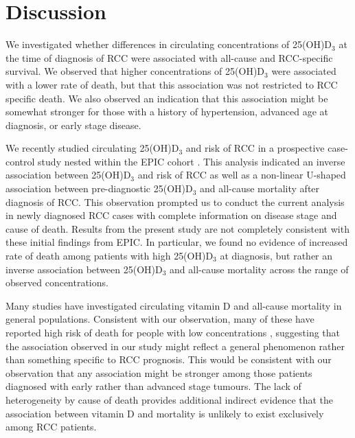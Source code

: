 \documentclass[a4paper,11pt]{article}
\renewcommand{\cite}{\citep}
\begin{document}
\section*{Discussion}
We investigated whether differences in circulating concentrations of 
25(OH)D$_3$ at the time of diagnosis of RCC were associated with all-cause and 
RCC-specific survival. We observed that higher concentrations of 25(OH)D$_3$ 
were associated with a lower rate of death, but that this association was not 
restricted to RCC specific death. We also observed an indication that this 
association might be somewhat stronger for those with a 
history of hypertension, advanced age at diagnosis, or early stage disease.

We recently studied circulating 25(OH)D$_3$ and risk of RCC in a prospective
case-control study nested within the EPIC cohort \cite{muller_circulating_2014}.
This analysis indicated an inverse association between 
25(OH)D$_3$ and risk of RCC as well as a non-linear U-shaped association 
between pre-diagnostic 25(OH)D$_3$ and all-cause mortality after diagnosis 
of RCC. This observation prompted us to conduct the current analysis in newly 
diagnosed RCC cases with complete information on disease stage 
and cause of death. Results from the present study are not completely 
consistent with these initial findings from EPIC. In particular, we found no 
evidence of increased rate of death among patients with high 25(OH)D$_3$ at 
diagnosis, but rather an inverse association between 25(OH)D$_3$ and all-cause 
mortality across the range of observed concentrations.

Many studies have investigated circulating vitamin D and all-cause 
mortality in general populations. Consistent with our observation, many of these
have reported high risk of death for people with low concentrations 
\cite{schottker_strong_2013, virtanen_association_2011, hutchinson_low_2010, 
szulc_serum_2009, semba_low_2009, pilz_vitamin_2009, 
melamed_ml_25-hydroxyvitamin_2008, jia_nutritional_2007}, suggesting that 
the association observed in our study might reflect a general phenomenon rather 
than something specific to RCC prognosis. This would be consistent with our 
observation that any association might be stronger among those patients 
diagnosed with early rather than advanced stage tumours. The lack of 
heterogeneity by cause of death provides additional indirect evidence that the 
association between vitamin D and mortality is unlikely to exist exclusively 
among RCC patients. 
\end{document}
